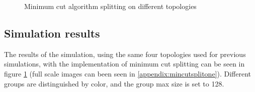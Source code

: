 \begin{figure}
	\centering
		\qquad
		\qquad

		\qquad
		\qquad	
		\caption{Minimum cut algorithm splitting on different topologies}%
		\label{fig:mincutresults}%
\end{figure}


\subsection{Simulation results}
The results of the simulation, using the same four topologies used for previous simulations, with the implementation of minimum cut splitting can be seen in figure \ref{fig:mincutresults} (full scale images can been seen in \ref{appendix:mincutsplitone}).
Different groups are distinguished by color, and the group max size is set to 128. 


